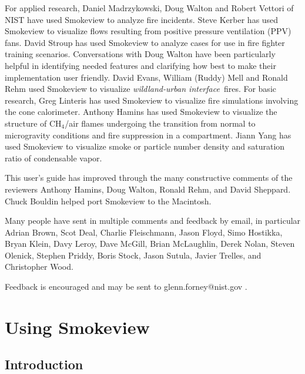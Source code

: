 \documentclass[11pt,twoside]{book}
\begin{document}
For applied research, Daniel Madrzykowski, Doug Walton and Robert
Vettori of NIST have used Smokeview to analyze fire incidents.
Steve Kerber has used Smokeview to visualize flows resulting from
positive pressure ventilation (PPV) fans. David Stroup has used
Smokeview to analyze cases for use in fire fighter training
scenarios.  Conversations with Doug Walton have been particularly
helpful in identifying needed features and clarifying how best to
make their implementation user friendly.  David Evans, William
(Ruddy) Mell and Ronald Rehm used Smokeview to visualize {\em
wildland-urban interface}\ fires.   For basic research, Greg
Linteris has used Smokeview to visualize fire simulations
involving the cone calorimeter. Anthony Hamins has used Smokeview
to visualize the structure of CH$_4$/air flames undergoing the
transition from normal to microgravity conditions and fire
suppression in a compartment. Jiann Yang has used Smokeview to
visualize smoke or particle number density and saturation ratio of
condensable vapor.

This user's guide has improved through the many constructive
comments of the reviewers Anthony Hamins, Doug Walton, Ronald
Rehm, and David Sheppard. Chuck Bouldin helped port Smokeview to
the Macintosh.

Many people have sent in multiple comments and feedback by email,
in particular Adrian Brown, Scot Deal, Charlie Fleischmann, Jason
Floyd, Simo Hostikka, Bryan Klein, Davy Leroy, Dave McGill, Brian
McLaughlin, Derek Nolan, Steven Olenick, Stephen Priddy, Boris
Stock, Jason Sutula, Javier Trelles, and Christopher Wood.

Feedback is encouraged and may be sent to glenn.forney@nist.gov .

\cleardoublepage
\tableofcontents

\cleardoublepage
\listoffigures

\cleardoublepage
\listoftables

\mainmatter



\part{Using Smokeview}
\chapter{Introduction}
\end{document}
